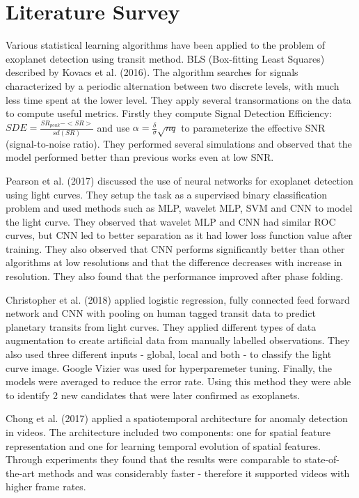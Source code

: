 \documentclass[%
aip,
amsmath,amssymb,
reprint,%
]{revtex4-1}
\begin{document}
\section{Literature Survey}

Various statistical learning algorithms have been applied to the problem of exoplanet detection using transit method. BLS (Box-fitting Least Squares) described by Kovacs et al. (2016). The algorithm searches for signals characterized by a periodic alternation between two discrete levels, with much less time spent at the lower level. They apply several transormations on the data to compute useful metrics. Firstly they compute Signal Detection Efficiency: $SDE = \frac{SR_{peak}-<SR>}{sd(SR)}$ and use $\alpha = \frac{\delta}{\sigma}\sqrt{nq}$ to parameterize the effective SNR (signal-to-noise ratio). They performed several simulations and observed that the model performed better than previous works even at low SNR.

Pearson et al. (2017) discussed the use of neural networks for exoplanet detection using light curves. They setup the task as a supervised binary classification problem and used methods such as MLP, wavelet MLP, SVM and CNN to model the light curve. They observed that wavelet MLP and CNN had similar ROC curves, but CNN led to better separation as it had lower loss function value after training. They also observed that CNN performs significantly better than other algorithms at low resolutions and that the difference decreases with increase in resolution. They also found that the performance improved after phase folding.

Christopher et al. (2018) applied logistic regression, fully connected feed forward network and CNN with pooling on human tagged transit data to predict planetary transits from light curves. They applied different types of data augmentation to create artificial data from manually labelled observations. They also used three different inputs - global, local and both - to classify the light curve image. Google Vizier was used for hyperparemeter tuning. Finally, the models were averaged to reduce the error rate. Using this method they were able to identify 2 new candidates that were later confirmed as exoplanets.

Chong et al. (2017) applied a spatiotemporal architecture for anomaly detection in videos. The architecture included two components: one for spatial feature representation and one for learning temporal evolution of spatial features. Through experiments they found that the results were comparable to state-of-the-art methods and was considerably faster - therefore it supported videos with higher frame rates.
\end{document}
